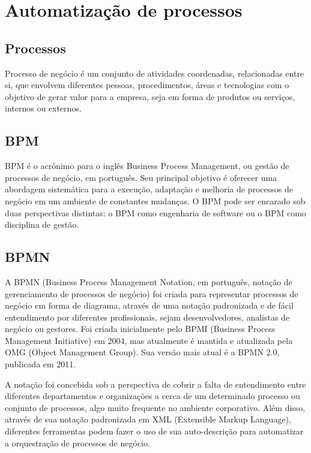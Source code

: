 \chapter{Automatização de processos}\label{chp:automatizacao_processos}

\section{Processos}\label{sec:automatizacao_processos-processos}
Processo de negócio é um conjunto de atividades coordenadas, relacionadas entre si, que envolvem diferentes pessoas, procedimentos, áreas e tecnologias com o objetivo de gerar valor para a empresa, seja em forma de produtos ou serviços, internos ou externos.

\section{BPM}\label{sec:automatizacao_processos-bpm}
BPM é o acrônimo para o inglês Business Process Management, ou gestão de processos de negócio, em português. Seu principal objetivo é oferecer uma abordagem sistemática para a execução, adaptação e melhoria de processos de negócio em um ambiente de constantes mudanças. O BPM pode ser encarado sob duas perspectivas distintas: o BPM como engenharia de software ou o BPM como disciplina de gestão.

\section{BPMN}\label{sec:automatizacao_processos-bpmn}
A BPMN (Business Process Management Notation, em português, notação de gerenciamento de processos de negócio) foi criada para representar processos de negócio em forma de diagrama, através de uma notação padronizada e de fácil entendimento por diferentes profissionais, sejam desenvolvedores, analistas de negócio ou gestores. Foi criada inicialmente pelo BPMI (Business Process Management Initiative) em 2004, mas atualmente é mantida e atualizada pela OMG (Object Management Group). Sua versão mais atual é a BPMN 2.0, publicada em 2011.

A notação foi concebida sob a perspectiva de cobrir a falta de entendimento entre diferentes departamentos e organizações a cerca de um determinado processo ou conjunto de processos, algo muito frequente no ambiente corporativo. Além disso, através de sua notação padronizada em XML (Extensible Markup Language), diferentes ferramentas podem fazer o uso de sua auto-descrição para automatizar a orquestração de processos de negócio.

